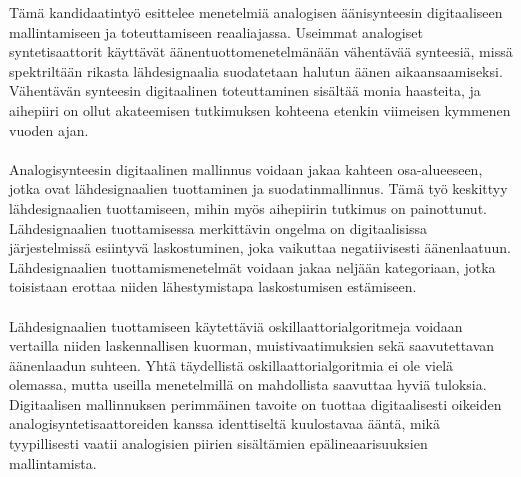 \documentclass[finnish,12pt,a4paper,pdftex]{article} %
\begin{document}
	



\author{Juri Lukkarila}



\date{10.12.2014}




\makecoverpage


\setcounter{page}{1} 

\begin{abstractpage}[finnish]

Tämä kandidaatintyö esittelee menetelmiä analogisen äänisynteesin digitaaliseen mallintamiseen ja toteuttamiseen reaaliajassa. Useimmat analogiset syntetisaattorit käyttävät äänentuottomenetelmänään vähentävää synteesiä, missä spektriltään rikasta lähdesignaalia suodatetaan halutun äänen aikaansaamiseksi. Vähentävän synteesin digitaalinen toteuttaminen sisältää monia haasteita, ja aihepiiri on ollut akateemisen tutkimuksen kohteena etenkin viimeisen kymmenen vuoden ajan. \\\\
Analogisynteesin digitaalinen mallinnus voidaan jakaa kahteen osa-alueeseen, jotka ovat lähdesignaalien tuottaminen ja suodatinmallinnus. Tämä työ keskittyy lähdesignaalien tuottamiseen, mihin myös aihepiirin tutkimus on painottunut. Lähdesignaalien tuottamisessa merkittävin ongelma on digitaalisissa järjestelmissä esiintyvä laskostuminen, joka vaikuttaa negatiivisesti äänenlaatuun. Lähdesignaalien tuottamismenetelmät voidaan jakaa neljään kategoriaan, jotka toisistaan erottaa niiden lähestymistapa laskostumisen estämiseen. \\\\
Lähdesignaalien tuottamiseen käytettäviä oskillaattorialgoritmeja voidaan vertailla niiden laskennallisen kuorman, muistivaatimuksien sekä saavutettavan äänenlaadun suhteen. Yhtä täydellistä oskillaattorialgoritmia ei ole vielä olemassa, mutta useilla menetelmillä on mahdollista saavuttaa hyviä tuloksia. Digitaalisen mallinnuksen perimmäinen tavoite on tuottaa digitaalisesti oikeiden analogisyntetisaattoreiden kanssa identtiseltä kuulostavaa ääntä, mikä tyypillisesti vaatii analogisien piirien sisältämien epälineaarisuuksien mallintamista.

\end{abstractpage}
\end{document}
